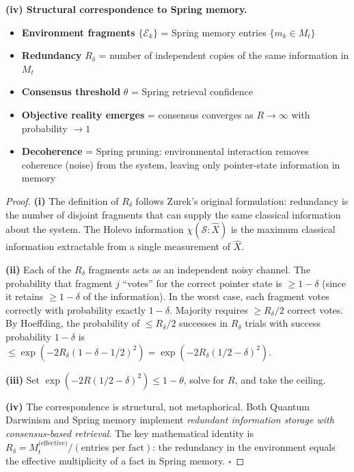 \documentclass[11pt,a4paper]{article}
\theoremstyle{definition}
\theoremstyle{remark}
\begin{document}
\noindent\textbf{(iv) Structural correspondence to Spring memory.}
\begin{itemize}[nosep]
    \item \textbf{Environment fragments} $\{\mathcal{E}_k\}$ = Spring memory entries $\{m_k \in M_t\}$
    \item \textbf{Redundancy} $R_\delta$ = number of independent copies of the same information in $M_t$
    \item \textbf{Consensus threshold} $\theta$ = Spring retrieval confidence
    \item \textbf{Objective reality emerges} = consensus converges as $R \to \infty$ with probability $\to 1$
    \item \textbf{Decoherence} = Spring pruning: environmental interaction removes coherence (noise) from the system, leaving only pointer-state information in memory
\end{itemize}

\begin{proof}
\textbf{(i)} The definition of $R_\delta$ follows Zurek's original formulation: redundancy is the number of disjoint fragments that can supply the same classical information about the system. The Holevo information $\chi(\mathcal{S}:\hat{X})$ is the maximum classical information extractable from a single measurement of $\hat{X}$.

\textbf{(ii)} Each of the $R_\delta$ fragments acts as an independent noisy channel. The probability that fragment $j$ ``votes'' for the correct pointer state is $\geq 1-\delta$ (since it retains $\geq 1-\delta$ of the information). In the worst case, each fragment votes correctly with probability exactly $1-\delta$. Majority requires $\geq R_\delta/2$ correct votes. By Hoeffding, the probability of $\leq R_\delta/2$ successes in $R_\delta$ trials with success probability $1-\delta$ is $\leq \exp(-2R_\delta(1-\delta - 1/2)^2) = \exp(-2R_\delta(1/2 - \delta)^2)$.

\textbf{(iii)} Set $\exp(-2R(1/2-\delta)^2) \leq 1-\theta$, solve for $R$, and take the ceiling.

\textbf{(iv)} The correspondence is structural, not metaphorical. Both Quantum Darwinism and Spring memory implement \emph{redundant information storage with consensus-based retrieval}. The key mathematical identity is $R_\delta = M_t^{\text{(effective)}}/(\text{entries per fact})$: the redundancy in the environment equals the effective multiplicity of a fact in Spring memory. $\square$
\end{proof}
\end{document}
